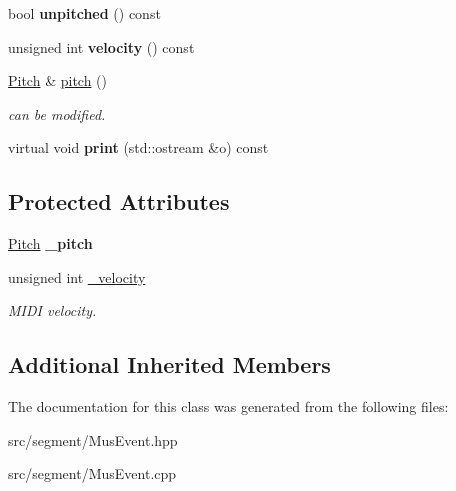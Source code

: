 \begin{DoxyCompactItemize}
bool {\bfseries unpitched} () const
\item 
\mbox{\label{classNoteEvent_a1129f35ed935be6cdc0ce4609677795d}} 
unsigned int {\bfseries velocity} () const
\item 
\mbox{\label{classNoteEvent_aa4a9213eb0af96782b6b50de0ef101b0}} 
\mbox{\hyperlink{classPitch}{Pitch}} \& \mbox{\hyperlink{classNoteEvent_aa4a9213eb0af96782b6b50de0ef101b0}{pitch}} ()
\begin{DoxyCompactList}\small\item\em can be modified. \end{DoxyCompactList}\item 
virtual void {\bfseries print} (std\+::ostream \&o) const
\end{DoxyCompactItemize}
\subsection*{Protected Attributes}
\begin{DoxyCompactItemize}
\item 
\mbox{\label{classNoteEvent_a3a9e39f1c7b38802f52f64bc03a0ba60}} 
\mbox{\hyperlink{classPitch}{Pitch}} {\bfseries \+\_\+pitch}
\item 
\mbox{\label{classNoteEvent_afeec6adc37e86a01e903dfb6fd24d8e7}} 
unsigned int \mbox{\hyperlink{classNoteEvent_afeec6adc37e86a01e903dfb6fd24d8e7}{\+\_\+velocity}}
\begin{DoxyCompactList}\small\item\em M\+I\+DI velocity. \end{DoxyCompactList}\end{DoxyCompactItemize}
\subsection*{Additional Inherited Members}


The documentation for this class was generated from the following files\+:\begin{DoxyCompactItemize}
\item 
src/segment/Mus\+Event.\+hpp\item 
src/segment/Mus\+Event.\+cpp\end{DoxyCompactItemize}
